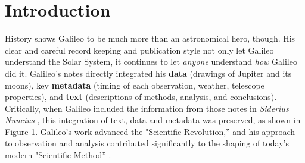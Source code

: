 \section{Introduction}
History shows Galileo to be much more than an
astronomical hero, though. His clear and careful record keeping and
publication style not only let Galileo understand the Solar System, it
continues to let \emph{anyone} understand \emph{how} Galileo did it.
Galileo's notes directly integrated his \textbf{data} (drawings of
Jupiter and its moons), key \textbf{metadata} (timing of each
observation, weather, telescope properties), and \textbf{text}
(descriptions of methods, analysis, and conclusions). Critically, when
Galileo included the information from those notes in \emph{Siderius
Nuncius} \cite{galilei}, this integration of text, data and metadata was
preserved, as shown in Figure 1. Galileo's work advanced the
"Scientific Revolution,'' and his approach to observation and analysis
contributed significantly to the shaping of today's modern "Scientific
Method'' \cite{galilei1618assayer,galilei1957discoveries}.